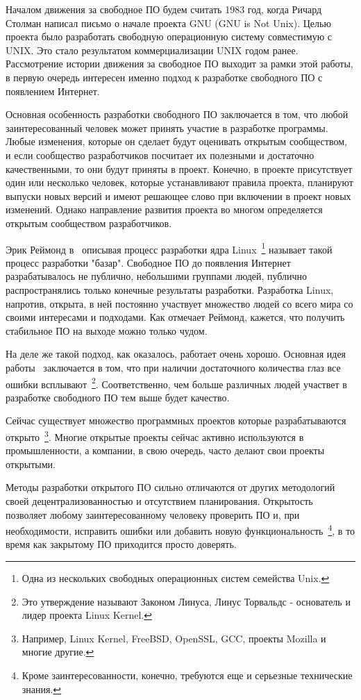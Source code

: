 Началом движения за свободное ПО будем считать 1983 год, когда Ричард Столман написал письмо о начале проекта GNU (GNU is Not Unix). Целью проекта было разработать свободную операционную систему совместимую с UNIX. Это стало результатом коммерциализации UNIX годом ранее. Рассмотрение истории движения за свободное ПО выходит за рамки этой работы, в первую очередь интересен именно подход к разработке свободного ПО с появлением Интернет.

Основная особенность разработки свободного ПО заключается в том, что любой заинтересованный человек может принять участие в разработке программы. Любые изменения, которые он сделает будут оценивать открытым сообществом, и если сообщество разработчиков посчитает их полезными и достаточно качественными, то они будут приняты в проект. Конечно, в проекте присутствует один или несколько человек, которые устанавливают правила проекта, планируют выпуски новых версий и имеют решающее слово при включении в проект новых изменений. Однако направление развития проекта во многом определяется открытым сообществом разработчиков.

Эрик Реймонд в~\cite{Raymond:1999:CB} описывая процесс разработки ядра Linux~\footnote{Одна из нескольких свободных операционных систем семейства Unix.} называет такой процесс разработки "базар". Свободное ПО до появления Интернет разрабатывалось не публично, небольшими группами людей, публично распространялись только конечные результаты разработки. Разработка Linux, напротив, открыта, в ней постоянно участвует множество людей со всего мира со своими интересами и подходами. Как отмечает Реймонд, кажется, что получить стабильное ПО на выходе можно только чудом.

На деле же такой подход, как оказалось, работает очень хорошо. Основная идея работы~\cite{Raymond:1999:CB} заключается в том, что при наличии достаточного количества глаз все ошибки всплывают~\footnote{Это утверждение называют Законом Линуса, Линус Торвальдс - основатель и лидер проекта Linux Kernel.}. Соответственно, чем больше различных людей участвет в разработке свободного ПО тем выше будет качество.

Сейчас существует множество программных проектов которые разрабатываются открыто~\footnote{Например, Linux Kernel, FreeBSD, OpenSSL, GCC, проекты Mozilla и многие другие.}. Многие открытые проекты сейчас активно используются в промышленности, а компании, в свою очередь, часто делают свои проекты открытыми.

Методы разработки открытого ПО сильно отличаются от других методологий своей децентрализованностью и отсутствием планирования. Открытость позволяет любому заинтересованному человеку проверить ПО и, при необходимости, исправить ошибки или добавить новую функциональность~\footnote{Кроме заинтересованности, конечно, требуются еще и серьезные технические знания.}, в то время как закрытому ПО приходится просто доверять.
